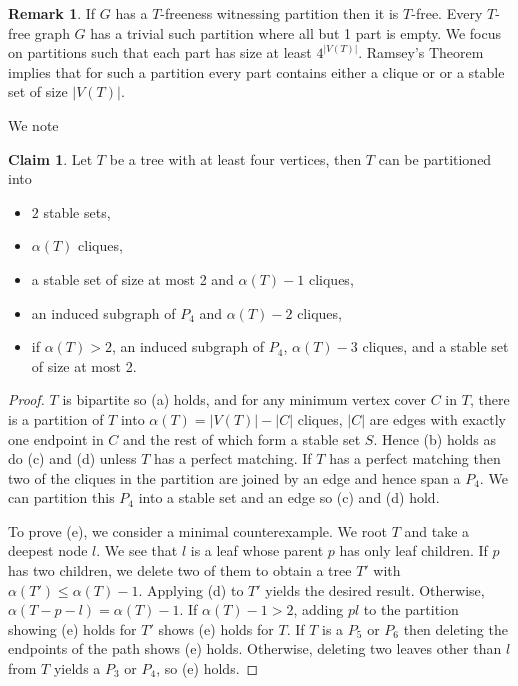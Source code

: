 \documentclass[12pt]{article}
\theoremstyle{definition}
\newtheorem{claim}[theorem]{Claim}
\newtheorem*{remark}{Remark}
\begin{document}
\begin{remark}
If $G$ has a $T$-freeness witnessing partition then it is $T$-free.
Every $T$-free graph $G$  has a trivial such partition where all but 1 part is empty. 
We focus on partitions  such that each part has size at least $4^{|V(T)|}$. 
Ramsey's Theorem \cite{R30} implies that for such a partition every part contains either a clique or
or a stable set of size $|V(T)|$. 
\end{remark}

We note


\begin{claim}\label{partAll}
Let $T$ be a tree with at least four vertices, then $T$ can be partitioned into
\begin{itemize}
\item[(a)] $2$ stable sets,  
\item[(b)] $\alpha(T)$ cliques, 
\item[(c)] a stable set of size at most 2 and $\alpha(T)-1$ cliques, 
\item[(d)] an induced subgraph of $P_4$ and $\alpha(T)-2$ cliques,
\item[(e)] if $\alpha(T)>2$, an induced subgraph of $P_4$, $\alpha(T)-3$ cliques, and a stable set of size at most 2. 
\end{itemize}
\end{claim}

\begin{proof}

$T$ is bipartite so (a) holds, and  for any minimum vertex cover $C$ in $T$, there is a partition of $T$ into $\alpha(T)=|V(T)|-|C|$ cliques, $|C|$ are edges with exactly one endpoint in $C$ and the rest of which form a stable set $S$. 
Hence (b) holds  as do  (c) and (d) unless $T$ has a perfect matching. If $T$ has a perfect matching then two of the
cliques in the partition  are joined by an edge and hence span a $P_4$. We can partition this $P_4$ into a stable set and an edge 
so (c) and (d) hold.  

To prove  (e), we consider a minimal counterexample.  
We root $T$ and  take a deepest node $l$. We see that $l$ is a leaf whose parent $p$ has only leaf children.
If $p$ has two children, we delete two of them to obtain a tree $T'$ with $\alpha(T') \le \alpha(T)-1$.
Applying (d) to $T'$ yields the desired result. Otherwise, $\alpha(T-p-l)=\alpha(T)-1$.
If $\alpha(T)-1>2$, adding $pl$ to the partition showing  (e) holds for $T'$ shows (e) holds for $T$.
If $T$ is a $P_5$ or $P_6$ then deleting the endpoints of the path shows (e) holds. 
Otherwise, deleting two leaves other than $l$ from  $T$ yields a $P_3$ or $P_4$, so (e) holds. 
\end{proof}
\end{document}
